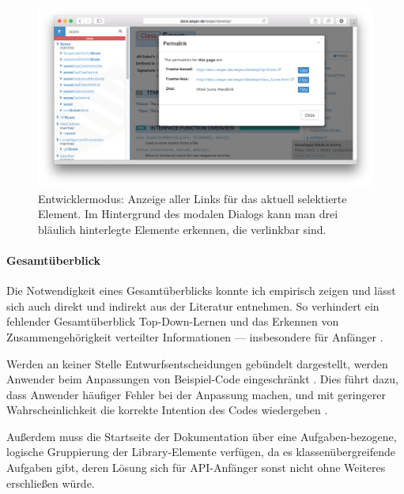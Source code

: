 \begin{figure}[ht!]
  \centering
    \includegraphics[width=0.9\linewidth]{Figures/dox/devmode-permalink.png}
    \caption[Entwicklermodus --- Anzeige aller Links für das aktuell selektierte Element]{Entwicklermodus: Anzeige aller Links für das aktuell selektierte Element. Im Hintergrund des modalen Dialogs kann man drei bläulich hinterlegte Elemente erkennen, die verlinkbar sind.}
    \label{fig:dox-devmode-permalink}
\end{figure}




\paragraph{Gesamtüberblick}

Die Notwendigkeit eines Gesamtüberblicks konnte ich empirisch zeigen und lässt sich auch direkt und indirekt aus der Literatur entnehmen. So verhindert ein fehlender Gesamtüberblick Top-Down-Lernen \citep[vgl.][]{Brooks:1983fj} und das Erkennen von Zusammengehörigkeit verteilter Informationen \citep[vgl.][]{BenShneiderman:gn} --- insbesondere für Anfänger \citep{Stylos:2008jt,Piccioni:2013uq}.

Werden an keiner Stelle Entwurfsentscheidungen gebündelt dargestellt, werden Anwender beim Anpassungen von Beispiel-Code eingeschränkt \citep{Bruch:2006bv}. Dies führt dazu, dass Anwender häufiger Fehler bei der Anpassung machen, und mit geringerer Wahrscheinlichkeit die korrekte Intention des Codes wiedergeben \citep{Fairbanks:2006jw}.

Außerdem muss die Startseite der Dokumentation über eine Aufgaben-bezogene, logische Gruppierung der Library-Elemente verfügen, da es klassenübergreifende Aufgaben gibt, deren Lösung sich für API-Anfänger sonst nicht ohne Weiteres erschließen würde. \citep{DaqingHou:2005ba,clarke:2006}

